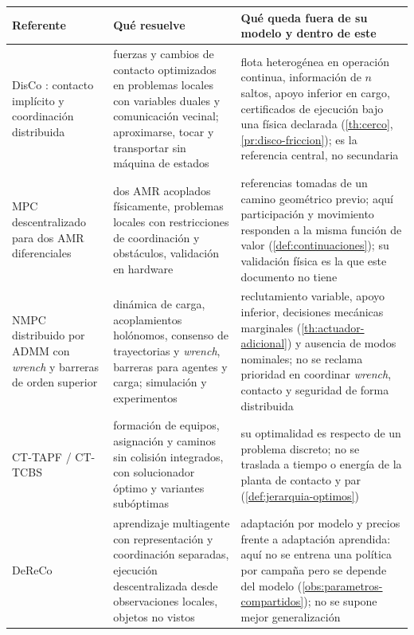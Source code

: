 \begin{center}\small
\begin{tabular}{@{}p{3.6cm}p{5.2cm}p{5.6cm}@{}}
\toprule
Referente & Qué resuelve & Qué queda fuera de su modelo y dentro de este \\
\midrule
DisCo \cite{shorinwa2024disco}: contacto implícito y coordinación distribuida
  & fuerzas y cambios de contacto optimizados en problemas locales con
    variables duales y comunicación vecinal; aproximarse, tocar y transportar
    sin máquina de estados
  & flota heterogénea en operación continua, información de $n$ saltos,
    apoyo inferior en \textsf{cargo}, certificados de ejecución bajo una
    física declarada (\cref{th:cerco}, \cref{pr:disco-friccion}); es la
    referencia central, no secundaria \\
MPC descentralizado para dos AMR diferenciales \cite{muhammed2026decentralized}
  & dos AMR acoplados físicamente, problemas locales con restricciones de
    coordinación y obstáculos, validación en hardware
  & referencias tomadas de un camino geométrico previo; aquí participación y
    movimiento responden a la misma función de valor
    (\cref{def:continuaciones}); su validación física es la que este
    documento no tiene \\
NMPC distribuido por ADMM con \emph{wrench} y barreras de orden superior \cite{sambhus2026distributed}
  & dinámica de carga, acoplamientos holónomos, consenso de trayectorias y
    \emph{wrench}, barreras para agentes y carga; simulación y experimentos
  & reclutamiento variable, apoyo inferior, decisiones mecánicas marginales
    (\cref{th:actuador-adicional}) y ausencia de modos nominales; no se
    reclama prioridad en coordinar \emph{wrench}, contacto y seguridad de
    forma distribuida \\
CT-TAPF / CT-TCBS \cite{zhou2026cttcbs}
  & formación de equipos, asignación y caminos sin colisión integrados, con
    solucionador óptimo y variantes subóptimas
  & su optimalidad es respecto de un problema discreto; no se traslada a
    tiempo o energía de la planta de contacto y par
    (\cref{def:jerarquia-optimos}) \\
DeReCo \cite{shibata2026dereco}
  & aprendizaje multiagente con representación y coordinación separadas,
    ejecución descentralizada desde observaciones locales, objetos no vistos
  & adaptación por modelo y precios frente a adaptación aprendida: aquí no se
    entrena una política por campaña pero se depende del modelo
    (\cref{obs:parametros-compartidos}); no se supone mejor generalización \\
\bottomrule
\end{tabular}
\end{center}

